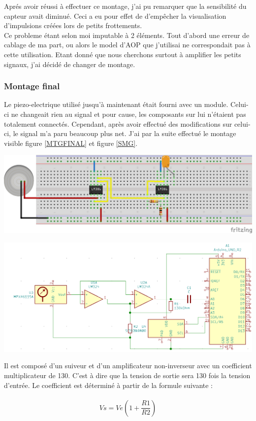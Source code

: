 \documentclass[12pt,french,a4paper]{article}
\begin{document}
Aprés avoir réussi à effectuer ce montage, j’ai pu remarquer que la sensibilité du capteur avait diminué. Ceci a eu pour effet de d’empêcher la visualisation d’impulsions créées lors de petits frottements.\\ Ce probleme étant selon moi imputable à 2 éléments. Tout d'abord une erreur de cablage de ma part, ou alors le model d'AOP que j'utilisai ne correspondait pas à cette utilisation. Etant donné que nous cherchons surtout à amplifier les petits signaux, j’ai décidé de changer de montage.

\subsubsection{Montage final}
Le piezo-electrique utilisé jusqu’à maintenant était fourni avec un module. Celui-ci ne changeait rien au signal et pour cause, les composants sur lui n’étaient pas totalement connectés. Cependant, après avoir effectué des modifications sur celui-ci, le signal m'a paru beaucoup plus net.
J’ai par la suite effectué le montage visible figure \ref{MTGFINAL} et figure \ref{SMG}.
\\
\begin{center}	
\includegraphics[scale=0.85]{../img/mtgfinal.png}
\label{MTGFINAL}
\end{center}

\begin{center}
    \includegraphics[scale=0.5]{../img/SMG.png}
    \label{SMG}
\end{center}
Il est composé d’un suiveur et d’un amplificateur non-inverseur avec un coefficient multiplicateur de 130. C'est à dire que la tension de sortie sera 130 fois la tension d'entrée. Le coefficient est déterminé à partir de la formule suivante : \\ \\
\[
	Vs = Ve (1 + \frac{R1}{R2})
\]
\end{document}

